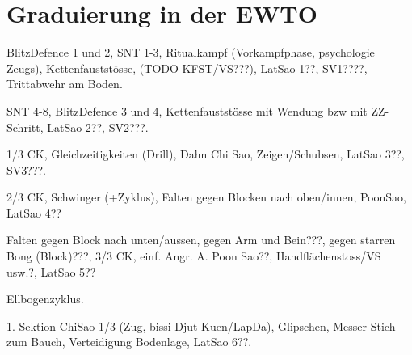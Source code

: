 \section{Graduierung in der EWTO}
\begin{WTGradSG}{1}

BlitzDefence 1 und 2, SNT 1-3, Ritualkampf (Vorkampfphase, psychologie Zeugs), Kettenfaustst\"osse, (TODO KFST/VS???), LatSao 1??, SV1????, Trittabwehr am Boden.

\end{WTGradSG}
\begin{WTGradSG}{2}

SNT 4-8, BlitzDefence 3 und 4, Kettenfaustst\"osse mit Wendung bzw mit ZZ-Schritt, LatSao 2??, SV2???.

\end{WTGradSG}
\begin{WTGradSG}{3}

1/3 CK, Gleichzeitigkeiten (Drill), Dahn Chi Sao, Zeigen/Schubsen, LatSao 3??, SV3???.

\end{WTGradSG}
\begin{WTGradSG}{4}

2/3 CK, Schwinger (+Zyklus), Falten gegen Blocken nach oben/innen, PoonSao, LatSao 4??

\end{WTGradSG}
\begin{WTGradSG}{5}

Falten gegen Block nach unten/aussen, gegen Arm und Bein???, gegen starren Bong (Block)???, 3/3 CK, einf. Angr. A. Poon Sao??, Handfl\"achenstoss/VS usw.?, LatSao 5??

Ellbogenzyklus.

\end{WTGradSG}
\begin{WTGradSG}{6}

1. Sektion ChiSao 1/3 (Zug, bissi Djut-Kuen/LapDa), Glipschen, Messer Stich zum Bauch, Verteidigung Bodenlage, LatSao 6??.

\end{WTGradSG}

